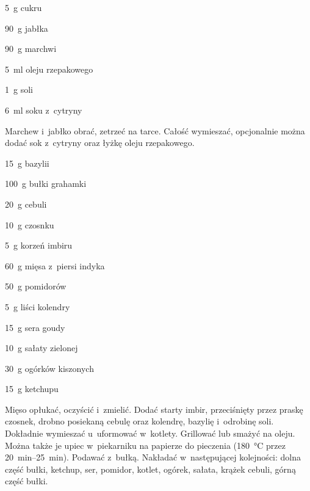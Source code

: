 \documentclass[../kucharek.tex]{subfiles}
\begin{document}

\begin{Ingred}
    \item \qty{5}{\gram} cukru
    \item \qty{90}{\gram} jabłka
    \item \qty{90}{\gram} marchwi
    \item \qty{5}{\milli\litre} oleju rzepakowego
    \item \qty{1}{\gram} soli
    \item \qty{6}{\milli\litre} soku z~cytryny
\end{Ingred}

Marchew i~jabłko obrać, zetrzeć na tarce. Całość wymieszać, opcjonalnie można
dodać sok z~cytryny oraz łyżkę oleju rzepakowego.


\begin{Ingred}
    \item \qty{15}{\gram} bazylii
    \item \qty{100}{\gram} bułki grahamki
    \item \qty{20}{\gram} cebuli
    \item \qty{10}{\gram} czosnku
    \item \qty{5}{\gram} korzeń imbiru
    \item \qty{60}{\gram} mięsa z~piersi indyka
    \item \qty{50}{\gram} pomidorów
    \item \qty{5}{\gram} liści kolendry
    \item \qty{15}{\gram} sera goudy
    \item \qty{10}{\gram} sałaty zielonej
    \item \qty{30}{\gram} ogórków kiszonych
    \item \qty{15}{\gram} ketchupu
\end{Ingred}

Mięso opłukać, oczyścić i~zmielić. Dodać starty imbir, przeciśnięty przez
praskę czosnek, drobno posiekaną cebulę oraz kolendrę, bazylię i~odrobinę soli.
Dokładnie wymieszać u~uformować w~kotlety. Grillować lub smażyć na oleju. Można
także je upiec w~piekarniku na papierze do pieczenia (\qty{180}{\celsius} przez
\qtyrange{20}{25}{\minute}). Podawać z~bułką. Nakładać w~następującej
kolejności: dolna część bułki, ketchup, ser, pomidor, kotlet, ogórek, sałata,
krążek cebuli, górną część bułki.

\end{document}

